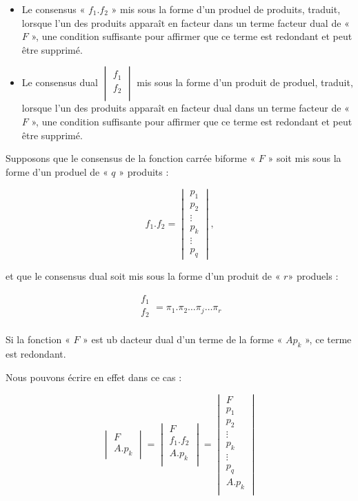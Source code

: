  \begin{itemize}
 \item Le \textsf{consensus} « $f_1 . f_2$ » mis sous la forme d'un produel de produits, traduit, lorsque l'un des produits apparaît en facteur dans un terme facteur dual de « $F$ », une condition suffisante pour affirmer que ce terme est redondant et peut être supprimé.
 
  \item Le \textsf{consensus dual} $ \begin{vmatrix} f_1 \\ f_2 \\ \end{vmatrix}$ mis sous la forme d'un produit de produel, traduit, lorsque l'un des produits apparaît en facteur dual dans un terme facteur de « $F$ », une condition suffisante pour affirmer que ce terme est redondant et peut être supprimé.
 
 \end{itemize}
 
 \medskip 

 Supposons que le consensus de la fonction carrée biforme « $F$ » soit mis sous la forme d'un produel de « $q$ » produits : 
 
 \[ f_1 . f_2 = \begin{vmatrix} p_1 \\ p_2 \\ \vdots \\ p_k  \\ \vdots \\ p_q \end{vmatrix}\text{,} \]
 
 et que le consensus dual soit mis sous  la forme d'un produit de « $r$» produels : 
 
\[ \begin{array}{|c|} f_1 \\ f_2 \\ \end{array} = \pi_1 . \pi_2\ldots \pi_j\ldots \pi_r  \]

 \medskip 
 
 Si la fonction « $F$ » est ub dacteur dual d'un terme de la forme « $Ap_k$ », ce terme est redondant.
 
 Nous pouvons écrire en effet dans ce cas : 
 
 \[ \begin{vmatrix}
 F\\ A.p_k
 \end{vmatrix} = \begin{vmatrix} F \\  f_1 . f_2 \\ A . p_k \\\end{vmatrix} 
               = \begin{vmatrix} F \\ p_1 \\ p_2 \\ \vdots \\ p_k \\ \vdots \\ p_q \\A.p_k\\ \end{vmatrix}
 \]
 
